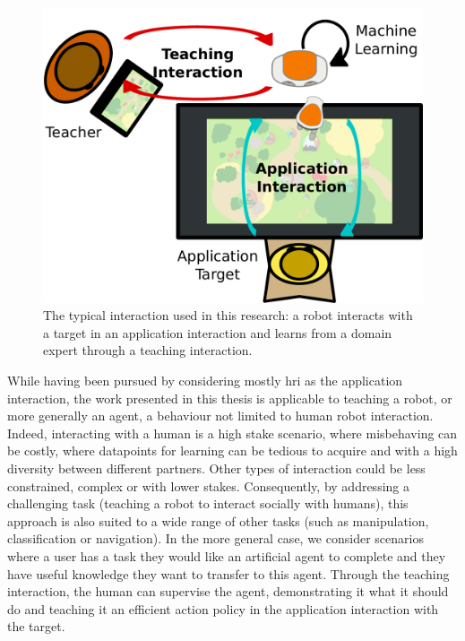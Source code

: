\begin{figure}[ht]
	\includegraphics[width=.7\linewidth]{setup.pdf}
	\centering
	\caption{The typical interaction used in this research: a robot interacts with a target in an application interaction and learns from a domain expert through a teaching interaction.}
	\label{fig:intro_setup}
\end{figure}

While having been pursued by considering mostly \gls{hri} as the application interaction, the work presented in this thesis is applicable to teaching a robot, or more generally an agent, a behaviour not limited to human robot interaction. Indeed, interacting with a human is a high stake scenario, where misbehaving can be costly, where datapoints for learning can be tedious to acquire and with a high diversity between different partners. Other types of interaction could be less constrained, complex or with lower stakes. Consequently, by addressing a challenging task (teaching a robot to interact socially with humans), this approach is also suited to a wide range of other tasks (such as manipulation, classification or navigation). In the more general case, we consider scenarios where a user has a task they would like an artificial agent to complete and they have useful knowledge they want to transfer to this agent. Through the teaching interaction, the human can supervise the agent, demonstrating it what it should do and teaching it an efficient action policy in the application interaction with the target. 



